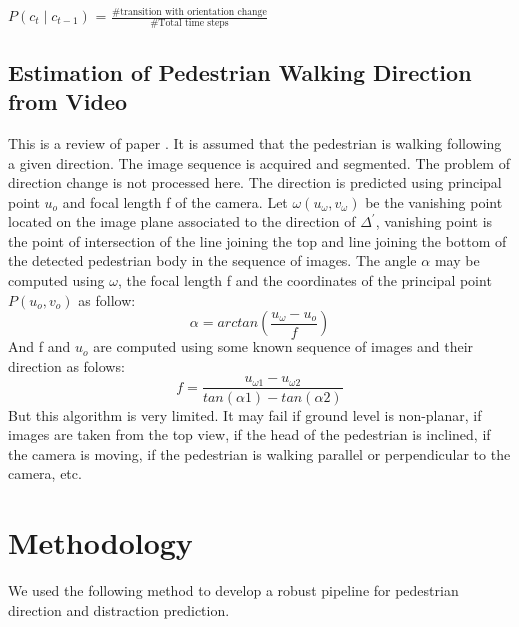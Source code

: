 \documentclass[extendedabs]{bmvc2k}
\begin{document}
${P(c_t \mid c_{t-1})}$ = ${\frac{\text{\# transition with orientation change}}{\text{\# Total time steps}}}$

\subsection{Estimation of Pedestrian Walking Direction from Video}
This is a review of paper \cite{8259689}. It is assumed that the pedestrian is walking following a given direction. The image sequence is acquired and segmented. The problem of direction change is not processed here. The direction is predicted using principal point $u_o$ and focal length f of the camera. Let $\omega(u_{\omega},v_{\omega})$ be the vanishing point located on the image plane associated to the direction of $\Delta^{'}$, vanishing point is the point of intersection of the line joining the top and line joining the bottom of the detected pedestrian body in the sequence of images. The angle $\alpha$ may be computed using $\omega$, the focal length f and the coordinates of the principal point $P(u_{o},v_{o})$ as follow:
\begin{equation}
    \alpha = arctan(\frac{u_{\omega}-u_{o}}{f})
\end{equation}
And f and $u_{o}$ are computed using some known sequence of images and their direction as folows:
\begin{equation}
    f = \frac{u_{\omega1}-u_{\omega2}}{tan(\alpha1)-tan(\alpha2)}
\end{equation}
But this algorithm is very limited. It may fail if ground level is non-planar, if images are taken from the top view, if the head of the pedestrian is inclined, if the camera is moving, if the pedestrian is walking parallel or perpendicular to the camera, etc.


\section{Methodology}
We used the following method to develop a robust pipeline for pedestrian direction and distraction prediction.
\end{document}
